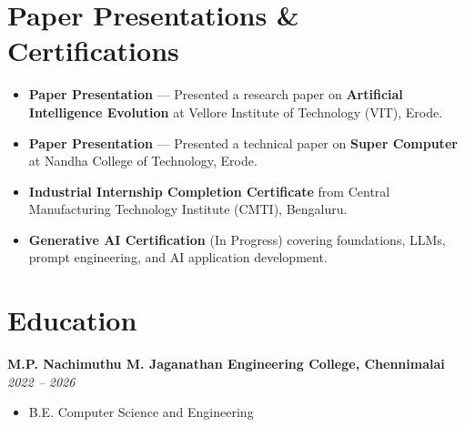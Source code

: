 \documentclass[11pt,a4paper]{article}
\newcommand{\resumeItem}[1]{\item \small #1}
\begin{document}
\section*{Paper Presentations \& Certifications}
\begin{itemize}
    \resumeItem{\textbf{Paper Presentation} — Presented a research paper on \textbf{Artificial Intelligence Evolution} at Vellore Institute of Technology (VIT), Erode.}
    \resumeItem{\textbf{Paper Presentation} — Presented a technical paper on \textbf{Super Computer} at Nandha College of Technology, Erode.}
    \resumeItem{\textbf{Industrial Internship Completion Certificate} from Central Manufacturing Technology Institute (CMTI), Bengaluru.}
    \resumeItem{\textbf{Generative AI Certification} (In Progress) covering foundations, LLMs, prompt engineering, and AI application development.}
\end{itemize}

\section*{Education}
\textbf{M.P. Nachimuthu M. Jaganathan Engineering College, Chennimalai} \hfill \textit{2022 -- 2026}
\begin{itemize}
    \resumeItem{B.E. Computer Science and Engineering}
\end{itemize}
\end{document}
